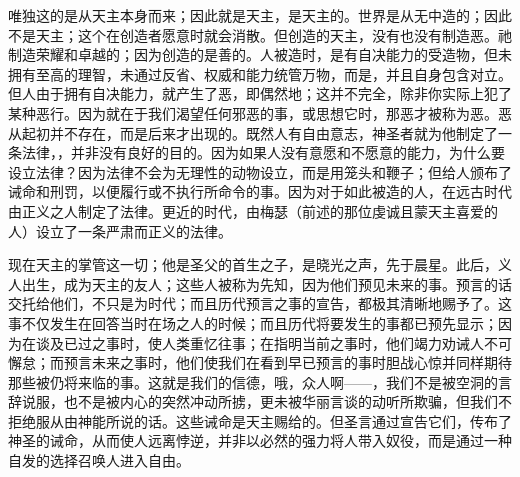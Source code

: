唯独这的是从天主本身而来；因此就是天主，是天主的。世界是从无中造的；因此不是天主；这个在创造者愿意时就会消散。但创造的天主，没有也没有制造恶。祂制造荣耀和卓越的；因为创造的是善的。人被造时，是有自决能力的受造物，但未拥有至高的理智，未通过反省、权威和能力统管万物，而是，并且自身包含对立。但人由于拥有自决能力，就产生了恶，即偶然地；这并不完全，除非你实际上犯了某种恶行。因为就在于我们渴望任何邪恶的事，或思想它时，那恶才被称为恶。恶从起初并不存在，而是后来才出现的。既然人有自由意志，神圣者就为他制定了一条法律，，并非没有良好的目的。因为如果人没有意愿和不愿意的能力，为什么要设立法律？因为法律不会为无理性的动物设立，而是用笼头和鞭子；但给人颁布了诫命和刑罚，以便履行或不执行所命令的事。因为对于如此被造的人，在远古时代由正义之人制定了法律。更近的时代，由梅瑟（前述的那位虔诚且蒙天主喜爱的人）设立了一条严肃而正义的法律。\par

现在天主的掌管这一切；他是圣父的首生之子，是晓光之声，先于晨星。此后，义人出生，成为天主的友人；这些人被称为先知，因为他们预见未来的事。预言的话交托给他们，不只是为时代；而且历代预言之事的宣告，都极其清晰地赐予了。这事不仅发生在回答当时在场之人的时候；而且历代将要发生的事都已预先显示；因为在谈及已过之事时，使人类重忆往事；在指明当前之事时，他们竭力劝诫人不可懈怠；而预言未来之事时，他们使我们在看到早已预言的事时胆战心惊并同样期待那些被仍将来临的事。这就是我们的信德，哦，众人啊——，我们不是被空洞的言辞说服，也不是被内心的突然冲动所掳，更未被华丽言谈的动听所欺骗，但我们不拒绝服从由神能所说的话。这些诫命是天主赐给的。但圣言通过宣告它们，传布了神圣的诫命，从而使人远离悖逆，并非以必然的强力将人带入奴役，而是通过一种自发的选择召唤人进入自由。\par

